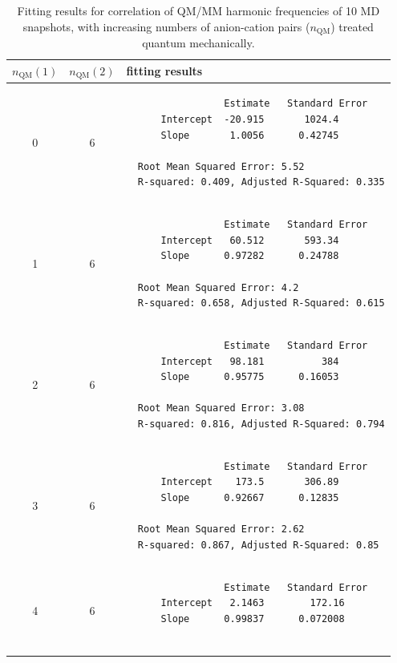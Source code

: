 \documentclass[%
  class = book,%
  crop = false,%
  float = true,%
  multi = true,%
  preview = false,%
]{standalone}
\begin{document}
\begin{table}
  \centering
  \caption[Fit procedure results for DVR convergence]{Fitting results for correlation of QM/MM harmonic frequencies of \num{10} MD snapshots, with increasing numbers of anion-cation pairs (\(n_{\text{QM}}\)) treated quantum mechanically.}
  \label{paper_02:tab:S6}
  \footnotesize
  \begin{tabular}{ccl}
    \toprule
    \(n_{\text{QM}}(1)\) & \(n_{\text{QM}}(2)\) & fitting results \\
    \midrule
    0 & 6 &
            \begin{minipage}{4.5in}
\begin{verbatim}
                 Estimate   Standard Error
      Intercept  -20.915       1024.4
      Slope       1.0056      0.42745

  Root Mean Squared Error: 5.52
  R-squared: 0.409, Adjusted R-Squared: 0.335
\end{verbatim}
            \end{minipage} \\
    1 & 6 &
            \begin{minipage}{4.5in}
\begin{verbatim}
                 Estimate   Standard Error
      Intercept   60.512       593.34
      Slope      0.97282      0.24788

  Root Mean Squared Error: 4.2
  R-squared: 0.658, Adjusted R-Squared: 0.615
\end{verbatim}
            \end{minipage} \\
    2 & 6 &
            \begin{minipage}{4.5in}
\begin{verbatim}
                 Estimate   Standard Error
      Intercept   98.181          384
      Slope      0.95775      0.16053

  Root Mean Squared Error: 3.08
  R-squared: 0.816, Adjusted R-Squared: 0.794
\end{verbatim}
            \end{minipage} \\
    3 & 6 &
            \begin{minipage}{4.5in}
\begin{verbatim}
                 Estimate   Standard Error
      Intercept    173.5       306.89
      Slope      0.92667      0.12835

  Root Mean Squared Error: 2.62
  R-squared: 0.867, Adjusted R-Squared: 0.85
\end{verbatim}
            \end{minipage} \\
    4 & 6 &
            \begin{minipage}{4.5in}
\begin{verbatim}
                 Estimate   Standard Error
      Intercept   2.1463        172.16
      Slope      0.99837      0.072008


\end{verbatim}
\end{minipage}
\end{tabular}
\end{table}
\end{document}
